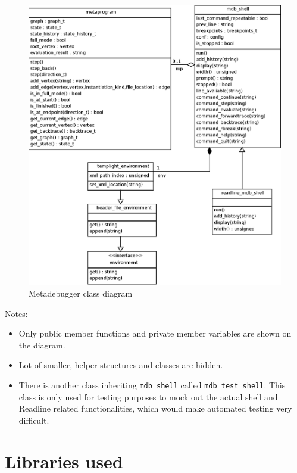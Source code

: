 \begin{figure}[H]
    \centering
    \includegraphics[width=\textwidth]{img/mdb_class_diagram.eps}
    \caption{Metadebugger class diagram}
\end{figure}

\noindent
Notes:
\begin{itemize}
    \item
        Only public member functions and private member variables are shown
        on the diagram.
    \item
        Lot of smaller, helper structures and classes are hidden.
    \item
        There is another class inheriting \texttt{mdb\_shell} called
        \texttt{mdb\_test\_shell}. This class is only used for testing
        purposes to mock out the actual shell and Readline related
        functionalities, which would make automated testing very difficult.
\end{itemize}

\section{Libraries used}

